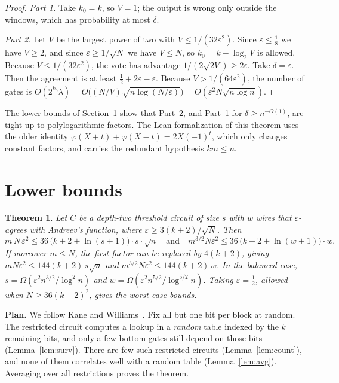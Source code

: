 \documentclass[11pt,letterpaper]{article}
\newtheorem{theorem}{Theorem}
\theoremstyle{remark}
\newcommand{\sect}[1]{\section{\texorpdfstring{\color{ink}#1}{#1}}}
\newcommand{\smalltitle}[1]{\textbf{\color{ink}#1}\quad}
\begin{document}
\begin{proof}
\emph{Part 1.} Take $k_0=k$, so $V=1$; the output is wrong only outside the
windows, which has probability at most $\delta$.

\emph{Part 2.} Let $V$ be the largest power of two with
$V\le1/(32\varepsilon^2)$. Since $\varepsilon\le\frac18$ we have $V\ge2$, and
since $\varepsilon\ge1/\sqrt N$ we have $V\le N$, so $k_0=k-\log_2V$ is
allowed. Because $V\le1/(32\varepsilon^2)$, the vote has advantage
$1/(2\sqrt{2V})\ge2\varepsilon$. Take $\delta=\varepsilon$. Then the agreement
is at least $\tfrac12+2\varepsilon-\varepsilon$. Because
$V>1/(64\varepsilon^2)$, the number of gates is
$O(2^{k_0}\lambda)=O\bigl((N/V)\sqrt{n\log(N/\varepsilon)}\bigr)
=O(\varepsilon^2N\sqrt{n\log n})$.
\end{proof}

The lower bounds of Section~\ref{sec:lower} show that Part~2, and Part~1 for
$\delta\ge n^{-O(1)}$, are tight up to polylogarithmic factors. The Lean
formalization of this theorem uses the older identity
$\varphi(X+t)+\varphi(X-t)=2X(-1)^t$, which only changes constant factors, and
carries the redundant hypothesis $km\le n$.

\sect{Lower bounds}\label{sec:lower}

\begin{theorem}\label{thm:lower}
Let $C$ be a depth-two threshold circuit of size $s$ with $w$ wires that
$\varepsilon$-agrees with Andreev's function, where
$\varepsilon\ge3(k+2)/\sqrt N$. Then
\[
m\,N\,\varepsilon^2\le 36\,\bigl(k+2+\ln(s+1)\bigr)\cdot s\cdot\sqrt n
\quad\text{and}\quad
m^{3/2}N\varepsilon^2\le 36\,\bigl(k+2+\ln(w+1)\bigr)\cdot w .
\]
If moreover $m\le N$, the first factor can be replaced by $4(k+2)$, giving
$mN\varepsilon^2\le144(k+2)\,s\sqrt n$ and
$m^{3/2}N\varepsilon^2\le144(k+2)\,w$. In the balanced case,
$s=\Omega(\varepsilon^2n^{3/2}/\log^2n)$ and
$w=\Omega(\varepsilon^2n^{5/2}/\log^{5/2}n)$. Taking $\varepsilon=\tfrac12$,
allowed when $N\ge36(k+2)^2$, gives the worst-case bounds.
\end{theorem}

\smalltitle{Plan.}
We follow Kane and Williams~\cite{KW}. Fix all but one bit per block at
random. The restricted circuit computes a lookup in a \emph{random} table
indexed by the $k$ remaining bits, and only a few bottom gates still depend
on those bits (Lemma~\ref{lem:surv}). There are few such restricted circuits
(Lemma~\ref{lem:count}), and none of them correlates well with a random
table (Lemma~\ref{lem:avg}). Averaging over all restrictions proves the
theorem.
\end{document}
